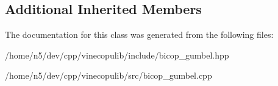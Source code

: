 \subsection*{Additional Inherited Members}


The documentation for this class was generated from the following files\+:\begin{DoxyCompactItemize}
\item 
/home/n5/dev/cpp/vinecopulib/include/bicop\+\_\+gumbel.\+hpp\item 
/home/n5/dev/cpp/vinecopulib/src/bicop\+\_\+gumbel.\+cpp\end{DoxyCompactItemize}
